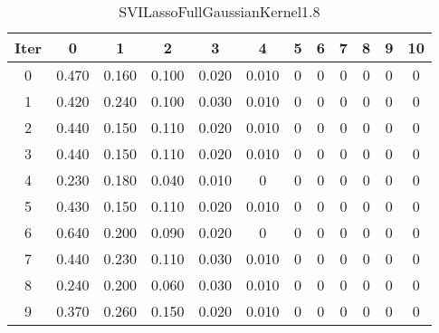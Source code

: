 \begin{table}
	\begin{center}
		\begin{tabular}{|c|c|c|c|c|c|c|c|c|c|c|c|}
			\hline
			Iter & 0 & 1 & 2 & 3 & 4 & 5 & 6 & 7 & 8 & 9 & 10 \\
			\hline
			0 & 0.470 & 0.160 & 0.100 & 0.020 & 0.010 & 0 & 0 & 0 & 0 & 0 & 0 \\
			\hline
			1 & 0.420 & 0.240 & 0.100 & 0.030 & 0.010 & 0 & 0 & 0 & 0 & 0 & 0 \\
			\hline
			2 & 0.440 & 0.150 & 0.110 & 0.020 & 0.010 & 0 & 0 & 0 & 0 & 0 & 0 \\
			\hline
			3 & 0.440 & 0.150 & 0.110 & 0.020 & 0.010 & 0 & 0 & 0 & 0 & 0 & 0 \\
			\hline
			4 & 0.230 & 0.180 & 0.040 & 0.010 & 0 & 0 & 0 & 0 & 0 & 0 & 0 \\
			\hline
			5 & 0.430 & 0.150 & 0.110 & 0.020 & 0.010 & 0 & 0 & 0 & 0 & 0 & 0 \\
			\hline
			6 & 0.640 & 0.200 & 0.090 & 0.020 & 0 & 0 & 0 & 0 & 0 & 0 & 0 \\
			\hline
			7 & 0.440 & 0.230 & 0.110 & 0.030 & 0.010 & 0 & 0 & 0 & 0 & 0 & 0 \\
			\hline
			8 & 0.240 & 0.200 & 0.060 & 0.030 & 0.010 & 0 & 0 & 0 & 0 & 0 & 0 \\
			\hline
			9 & 0.370 & 0.260 & 0.150 & 0.020 & 0.010 & 0 & 0 & 0 & 0 & 0 & 0 \\
			\hline
		\end{tabular}
	\end{center}
	\caption{SVILassoFullGaussianKernel1.8}
\end{table}